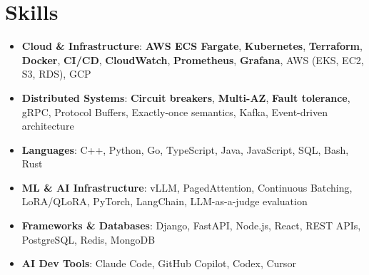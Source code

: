 \documentclass[letterpaper,11pt]{article}
\newcommand{\resumeSubHeadingListStart}{\begin{itemize}[leftmargin=0.15in, label={}]}
\newcommand{\resumeSubHeadingListEnd}{\end{itemize}}
\newcommand{\resumeSkillHeading}[2]{%
  \item\small{\textbf{#1}: #2 \vspace{-9pt}}%
}
\begin{document}
\section{Skills}
  \resumeSubHeadingListStart
    \resumeSkillHeading{Cloud \& Infrastructure}{\textbf{AWS ECS Fargate}, \textbf{Kubernetes}, \textbf{Terraform}, \textbf{Docker}, \textbf{CI/CD}, \textbf{CloudWatch}, \textbf{Prometheus}, \textbf{Grafana}, AWS (EKS, EC2, S3, RDS), GCP}
    \resumeSkillHeading{Distributed Systems}{\textbf{Circuit breakers}, \textbf{Multi-AZ}, \textbf{Fault tolerance}, gRPC, Protocol Buffers, Exactly-once semantics, Kafka, Event-driven architecture}
    \resumeSkillHeading{Languages}{C++, Python, Go, TypeScript, Java, JavaScript, SQL, Bash, Rust}
    \resumeSkillHeading{ML \& AI Infrastructure}{vLLM, PagedAttention, Continuous Batching, LoRA/QLoRA, PyTorch, LangChain, LLM-as-a-judge evaluation}
    \resumeSkillHeading{Frameworks \& Databases}{Django, FastAPI, Node.js, React, REST APIs, PostgreSQL, Redis, MongoDB}
    \resumeSkillHeading{AI Dev Tools}{Claude Code, GitHub Copilot, Codex, Cursor}
  \resumeSubHeadingListEnd
\end{document}
